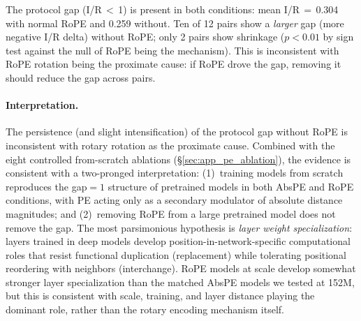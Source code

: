 \documentclass{article}
\begin{document}
The protocol gap (I/R\,$<$\,1) is present in both conditions: mean I/R\,$=$\,0.304 with normal RoPE and 0.259 without. Ten of 12 pairs show a \emph{larger} gap (more negative I/R delta) without RoPE; only 2 pairs show shrinkage ($p < 0.01$ by sign test against the null of RoPE being the mechanism). This is inconsistent with RoPE rotation being the proximate cause: if RoPE drove the gap, removing it should reduce the gap across pairs.

\paragraph{Interpretation.} The persistence (and slight intensification) of the protocol gap without RoPE is inconsistent with rotary rotation as the proximate cause. Combined with the eight controlled from-scratch ablations (\S\ref{sec:app_pe_ablation}), the evidence is consistent with a two-pronged interpretation: (1)~training models from scratch reproduces the gap${=}1$ structure of pretrained models in both AbsPE and RoPE conditions, with PE acting only as a secondary modulator of absolute distance magnitudes; and (2)~removing RoPE from a large pretrained model does not remove the gap. The most parsimonious hypothesis is \emph{layer weight specialization}: layers trained in deep models develop position-in-network-specific computational roles that resist functional duplication (replacement) while tolerating positional reordering with neighbors (interchange). RoPE models at scale develop somewhat stronger layer specialization than the matched AbsPE models we tested at 152M, but this is consistent with scale, training, and layer distance playing the dominant role, rather than the rotary encoding mechanism itself.
\end{document}
